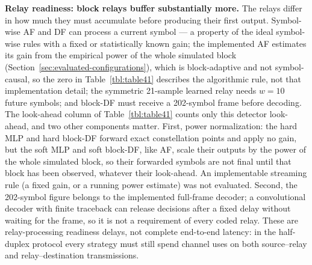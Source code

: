 \textbf{Relay readiness: block relays buffer substantially more.} The relays differ in how much they must accumulate before producing their first output. Symbol-wise AF and DF can process a current symbol --- a property of the ideal symbol-wise rules with a fixed or statistically known gain; the implemented AF estimates its gain from the empirical power of the whole simulated block (Section~\ref{sec:evaluated-configurations}), which is block-adaptive and not symbol-causal, so the zero in Table~\ref{tbl:table41} describes the algorithmic rule, not that implementation detail; the symmetric 21-sample learned relay needs $w=10$ future symbols; and block-DF must receive a 202-symbol frame before decoding. The look-ahead column of Table~\ref{tbl:table41} counts only this detector look-ahead, and two other components matter. First, power normalization: the hard MLP and hard block-DF forward exact constellation points and apply no gain, but the soft MLP and soft block-DF, like AF, scale their outputs by the power of the whole simulated block, so their forwarded symbols are not final until that block has been observed, whatever their look-ahead. An implementable streaming rule (a fixed gain, or a running power estimate) was not evaluated. Second, the 202-symbol figure belongs to the implemented full-frame decoder; a convolutional decoder with finite traceback can release decisions after a fixed delay without waiting for the frame, so it is not a requirement of every coded relay. These are relay-processing readiness delays, not complete end-to-end latency: in the half-duplex protocol every strategy must still spend channel uses on both source--relay and relay--destination transmissions.

